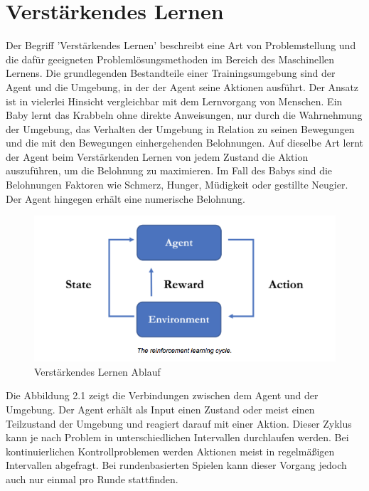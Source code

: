 {\chapter{Verstärkendes Lernen}}
\label{sec:rl}
Der Begriff 'Verstärkendes Lernen' beschreibt eine Art von Problemstellung und die dafür geeigneten Problemlösungsmethoden im Bereich des Maschinellen Lernens. Die grundlegenden Bestandteile einer Trainingsumgebung sind der Agent und die Umgebung, in der der Agent seine Aktionen ausführt. Der Ansatz ist in vielerlei Hinsicht vergleichbar mit dem Lernvorgang von Menschen. Ein Baby lernt das Krabbeln ohne direkte Anweisungen, nur durch die Wahrnehmung der Umgebung, das Verhalten der Umgebung in Relation zu seinen Bewegungen und die mit den Bewegungen einhergehenden Belohnungen. Auf dieselbe Art lernt der Agent beim Verstärkenden Lernen von jedem Zustand die Aktion auszuführen, um die Belohnung zu maximieren. Im Fall des Babys sind die Belohnungen Faktoren wie Schmerz, Hunger, Müdigkeit oder gestillte Neugier. Der Agent hingegen erhält eine numerische Belohnung.\cite{sutton2018reinforcement}

\begin{figure}[htb]
  \centering  
  \includegraphics[scale=0.5]{img/rl_cycle.png}
  \caption{Verstärkendes Lernen Ablauf \protect\cite{unity_mlagents_rl_cycle}}
  \label{fig:rl_cycle}
\end{figure}

Die Abbildung 2.1 zeigt die Verbindungen zwischen dem Agent und der Umgebung. Der Agent erhält als Input einen Zustand oder meist einen Teilzustand der Umgebung und reagiert darauf mit einer Aktion. Dieser Zyklus kann je nach Problem in unterschiedlichen Intervallen durchlaufen werden. Bei kontinuierlichen Kontrollproblemen werden Aktionen meist in regelmäßigen Intervallen abgefragt. Bei rundenbasierten Spielen kann dieser Vorgang jedoch auch nur einmal pro Runde stattfinden.